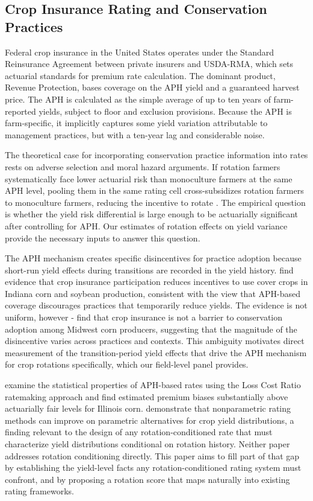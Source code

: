 \documentclass[12pt,letterpaper]{article}
\theoremstyle{remark}
\theoremstyle{remark}
\theoremstyle{plain}
\theoremstyle{definition}
\begin{document}
\subsection{\label{subsec:insurance_rating} Crop Insurance Rating and Conservation Practices}

Federal crop insurance in the United States operates under the Standard Reinsurance Agreement between private insurers and USDA-RMA, which sets actuarial standards for premium rate calculation. The dominant product, Revenue Protection, bases coverage on the APH yield and a guaranteed harvest price. The APH is calculated as the simple average of up to ten years of farm-reported yields, subject to floor and exclusion provisions. Because the APH is farm-specific, it implicitly captures some yield variation attributable to management practices, but with a ten-year lag and considerable noise.

The theoretical case for incorporating conservation practice information into rates rests on adverse selection and moral hazard arguments. If rotation farmers systematically face lower actuarial risk than monoculture farmers at the same APH level, pooling them in the same rating cell cross-subsidizes rotation farmers to monoculture farmers, reducing the incentive to rotate \citep{Ramaswami1993, Babcock1996}. The empirical question is whether the yield risk differential is large enough to be actuarially significant after controlling for APH. Our estimates of rotation effects on yield variance provide the necessary inputs to answer this question.

The APH mechanism creates specific disincentives for practice adoption because short-run yield effects during transitions are recorded in the yield history. \cite{Connor2022} find evidence that crop insurance participation reduces incentives to use cover crops in Indiana corn and soybean production, consistent with the view that APH-based coverage discourages practices that temporarily reduce yields. The evidence is not uniform, however - \cite{Fleckenstein2020} find that crop insurance is not a barrier to conservation adoption among Midwest corn producers, suggesting that the magnitude of the disincentive varies across practices and contexts. This ambiguity motivates direct measurement of the transition-period yield effects that drive the APH mechanism for crop rotations specifically, which our field-level panel provides.

\cite{Woodard2011} examine the statistical properties of APH-based rates using the Loss Cost Ratio ratemaking approach and find estimated premium biases substantially above actuarially fair levels for Illinois corn. \cite{Ker2000} demonstrate that nonparametric rating methods can improve on parametric alternatives for crop yield distributions, a finding relevant to the design of any rotation-conditioned rate that must characterize yield distributions conditional on rotation history. Neither paper addresses rotation conditioning directly. This paper aims to fill part of that gap by establishing the yield-level facts any rotation-conditioned rating system must confront, and by proposing a rotation score that maps naturally into existing rating frameworks.
\end{document}
